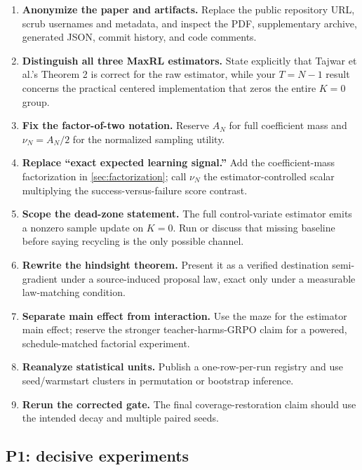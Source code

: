 \documentclass[11pt]{article}
\theoremstyle{definition}
\theoremstyle{remark}
\begin{document}
\begin{enumerate}[leftmargin=2em,label=\textbf{P0.\arabic*.}]
\item \textbf{Anonymize the paper and artifacts.} Replace the public repository URL, scrub usernames and metadata, and inspect the PDF, supplementary archive, generated JSON, commit history, and code comments.
\item \textbf{Distinguish all three MaxRL estimators.} State explicitly that Tajwar et al.'s Theorem 2 is correct for the raw estimator, while your $T=N-1$ result concerns the practical centered implementation that zeros the entire $K=0$ group.
\item \textbf{Fix the factor-of-two notation.} Reserve $A_N$ for full coefficient mass and $\nu_N=A_N/2$ for the normalized sampling utility.
\item \textbf{Replace ``exact expected learning signal.''} Add the coefficient-mass factorization in \cref{sec:factorization}; call $\nu_N$ the estimator-controlled scalar multiplying the success-versus-failure score contrast.
\item \textbf{Scope the dead-zone statement.} The full control-variate estimator emits a nonzero sample update on $K=0$. Run or discuss that missing baseline before saying recycling is the only possible channel.
\item \textbf{Rewrite the hindsight theorem.} Present it as a verified destination semi-gradient under a source-induced proposal law, exact only under a measurable law-matching condition.
\item \textbf{Separate main effect from interaction.} Use the maze for the estimator main effect; reserve the stronger teacher-harms-GRPO claim for a powered, schedule-matched factorial experiment.
\item \textbf{Reanalyze statistical units.} Publish a one-row-per-run registry and use seed/warmstart clusters in permutation or bootstrap inference.
\item \textbf{Rerun the corrected gate.} The final coverage-restoration claim should use the intended decay and multiple paired seeds.
\end{enumerate}

\subsection{P1: decisive experiments}
\end{document}

